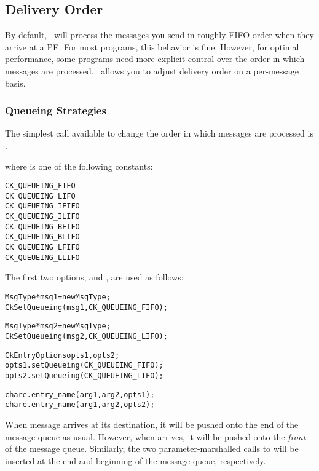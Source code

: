 \subsection{Delivery Order}

By default, \charmpp\ will process the messages you send in roughly
FIFO order when they arrive at a PE.
For most programs, this behavior is fine.  However, for optimal
performance, some programs need more explicit control over the order
in which messages are processed. \charmpp\ allows you to adjust
delivery order on a per-message basis.


\subsubsection{Queueing Strategies}
\label{queueing strategies}

The simplest call available to change the order in which messages
are processed is .


where  is one of the following constants:

\begin{alltt}
  CK_QUEUEING_FIFO
  CK_QUEUEING_LIFO
  CK_QUEUEING_IFIFO
  CK_QUEUEING_ILIFO
  CK_QUEUEING_BFIFO
  CK_QUEUEING_BLIFO
  CK_QUEUEING_LFIFO
  CK_QUEUEING_LLIFO
\end{alltt}

The first two options,   and
, are used as follows:

\begin{alltt}
  MsgType *msg1 = new MsgType ;
  CkSetQueueing(msg1, CK_QUEUEING_FIFO);

  MsgType *msg2 = new MsgType ;
  CkSetQueueing(msg2, CK_QUEUEING_LIFO);

  CkEntryOptions opts1, opts2;
  opts1.setQueueing(CK_QUEUEING_FIFO);
  opts2.setQueueing(CK_QUEUEING_LIFO);

  chare.entry_name(arg1, arg2, opts1);
  chare.entry_name(arg1, arg2, opts2);
\end{alltt}

When message  arrives at its destination, it will be pushed
onto the end of the message queue as usual.  However, when 
arrives, it will be pushed onto the {\em front} of the message
queue. Similarly, the two parameter-marshalled calls to 
will be inserted at the end and beginning of the message queue,
respectively.

